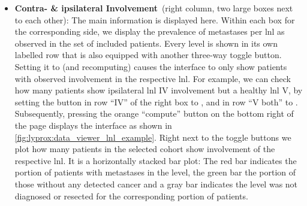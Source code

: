 \documentclass[\relativeRoot/main.tex]{subfiles}
\begin{document}
\begin{itemize}
    \item \textbf{Contra- \& ipsilateral Involvement}~(right column, two large boxes next to each other): The main information is displayed here. Within each box for the corresponding side, we display the prevalence of metastases per \gls{lnl} as observed in the set of included patients. Every level is shown in its own labelled row that is also equipped with another three-way toggle button. Setting it to  (and recomputing) causes the interface to only show patients with observed involvement in the respective \gls{lnl}. For example, we can check how many patients show ipsilateral \gls{lnl} IV involvement but a healthy \gls{lnl} V, by setting the button in row ``IV'' of the right box to , and in row ``V both'' to . Subsequently, pressing the orange ``compute'' button on the bottom right of the page displays the interface as shown in \cref{fig:lyprox:data_viewer_lnl_example}. Right next to the toggle buttons we plot how many patients in the selected cohort show involvement of the respective \gls{lnl}. It is a horizontally stacked bar plot: The red bar indicates the portion of patients with metastases in the level, the green bar the portion of those without any detected cancer and a gray bar indicates the level was not diagnosed or resected for the corresponding portion of patients.\\
    [3mm]
\end{itemize}
\end{document}
